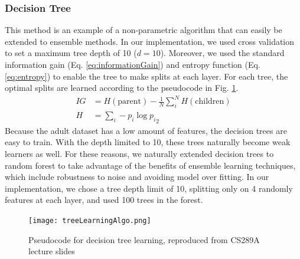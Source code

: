 \documentclass[conference]{IEEEtran}
\begin{document}
\subsubsection{ Decision Tree} 
This method is an example of a non-parametric algorithm that can easily be extended to ensemble methods. In our implementation, we used cross validation to set a maximum tree depth of 10 ($d=10$). Moreover, we used the standard information gain (Eq. \ref{eq:informationGain}) and entropy function (Eq. \ref{eq:entropy}) to enable the tree to make splits at each layer. For each tree, the optimal splits are learned according to the pseudocode in Fig. \ref{fig:treeLearningAlgo}.
\begin{align}
IG &= H(\text{parent}) - \frac{1}{N}\sum_i^N H(\text{children}) \label{eq:informationGain} \\
H &= \sum_i -p_i \log{p_i}_2 \label{eq:entropy}
\end{align}
Because the adult dataset has a low amount of features, the decision trees are easy to train. With the depth limited to 10, these trees naturally become weak learners as well. For these reasons, we naturally extended decision trees to random forest to take advantage of the benefits of ensemble learning techniques, which include robustness to noise and avoiding model over fitting. In our implementation, we chose a tree depth limit of 10, splitting only on 4 randomly features at each layer, and used 100 trees in the forest.
\begin{figure}[h!]
\centering
\texttt{[image: treeLearningAlgo.png]}
\caption{Pseudocode for decision tree learning, reproduced from CS289A lecture slides}
\label{fig:treeLearningAlgo}
\end{figure} \\
\end{document}
